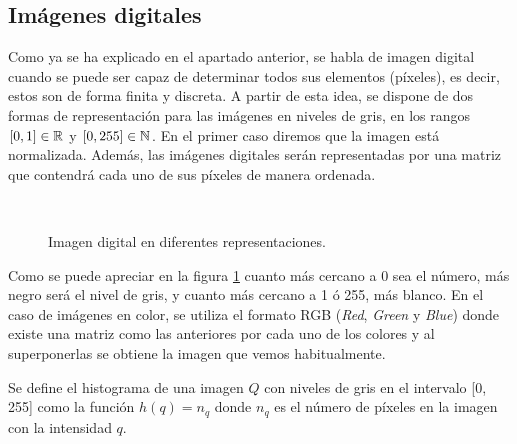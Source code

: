 \documentclass[main]{subfiles}
\begin{document}
\subsection{Imágenes digitales}\label{sec:imagenesdigitales}
Como ya se ha explicado en el apartado anterior, se habla de imagen digital cuando se puede ser capaz de determinar todos sus elementos (píxeles), es decir, estos son de forma finita y discreta. A partir de esta idea, se dispone de dos formas de representación para las imágenes en niveles de gris, en los rangos ${[0,1]\in\mathbb{R}}$ y ${[0,255]\in\mathbb{N}}$. En el primer caso diremos que la imagen está normalizada. Además, las imágenes digitales serán representadas por una matriz que contendrá cada uno de sus píxeles de manera ordenada.

\begin{figure}
\centering
    \quad
    \quad\
    \caption{Imagen digital en diferentes representaciones.}
    \label{fig:defimagen}
\end{figure}

Como se puede apreciar en la figura \ref{fig:defimagen} cuanto más cercano a 0 sea el número, más negro será el nivel de gris, y cuanto más cercano a 1 ó 255, más blanco. En el caso de imágenes en color, se utiliza el formato RGB ({\em Red}, {\em Green} y {\em Blue}) donde existe una matriz como las anteriores por cada uno de los colores y al superponerlas se obtiene la imagen que vemos habitualmente.

\begin{definition}\label{def:histograma}
Se define el histograma de una imagen $Q$ con niveles de gris en el intervalo [0, 255] como la función ${h(q) = n_q}$ donde ${n_q}$ es el número de píxeles en la imagen con la intensidad $q$.
\end{definition}
\end{document}
